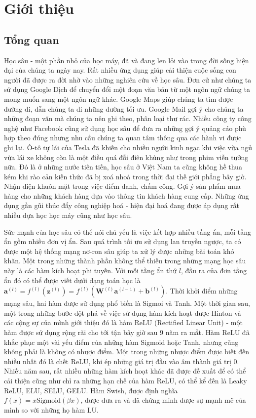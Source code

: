 \chapter{Giới thiệu}\label{chap:gioithieu}

\section{Tổng quan}\label{sec:tongquan}

Học sâu - một phần nhỏ của học máy, đã và đang len lỏi vào trong đời sống hiện đại của chúng ta ngày nay.
Rất nhiều ứng dụng giúp cải thiện cuộc sống con người đã được ra đời nhờ vào những nghiên cứu về học sâu.
Đơn cử như chúng ta sử dụng Google Dịch để chuyển đổi một đoạn văn bản từ một ngôn ngữ chúng ta mong muốn sang một ngôn ngữ khác.
Google Maps giúp chúng ta tìm được đường đi, dẫn chúng ta đi những đường tối ưu.
Google Mail gợi ý cho chúng ta những đoạn văn mà chúng ta nên ghi theo, phân loại thư rác.
Nhiều công ty công nghệ như Facebook cũng sử dụng học sâu để đưa ra những gợi ý quảng cáo phù hợp theo đúng nhưng nhu cầu chúng ta quan tâm thông qua các hành vi được ghi lại.
Ô-tô tự lái của Tesla đã khiến cho nhiều người kinh ngạc khi việc vừa ngủ vừa lái xe không còn là một điều quá đỗi điên khùng như trong phim viễn tưởng nữa.
Đó là ở những nước tiên tiến, học sâu ở Việt Nam ta cũng không hề thua kém khi rào cản kiến thức đã bị xoá nhoà trong thời đại thế giới phẳng bây giờ.
Nhận diện khuôn mặt trong việc điểm danh, chấm công.
Gợi ý sản phẩm mua hàng cho những khách hàng dựa vào thông tin khách hàng cung cấp.
Những ứng dụng gần gũi thúc đẩy công nghiệp hoá - hiện đại hoá đang được áp dụng rất nhiều dựa học học máy cũng như học sâu.
\vspace{5pt}

Sức mạnh của học sâu có thể nói chủ yếu là việc kết hợp nhiều tầng ẩn, mỗi tầng ẩn gồm nhiều đơn vị ẩn.
Sau quá trình tối ưu sử dụng lan truyền ngược, ta có được một hệ thống mạng nơ-ron sâu giúp ta xử lý được những bài toán khó khăn.
Một trong những thành phần không thể thiếu trong những mạng học sâu này là các hàm kích hoạt phi tuyến.
Với mỗi tầng ẩn thứ $l$, đầu ra của đơn tầng ẩn đó có thể được viết dưới dạng toán học là $\displaystyle \mathbf{a}^{(l)} = f^{(l)}\left(\mathbf{z}^{(l)}\right) = f^{(l)}\left(\mathbf{W}^{(l)}\mathbf{a}^{(l-1)} + \mathbf{b}^{(l)}\right)$.
Thời khởi điểm những mạng sâu, hai hàm được sử dụng phổ biến là Sigmoi và Tanh.
Một thời gian sau, một trong những bước đột phá về việc sử dụng hàm kích hoạt được Hinton và các cộng sự của mình giới thiệu đó là hàm ReLU (Rectified Linear Unit) - một hàm được sử dụng rộng rãi cho tới tận bây giờ sau 9 năm ra mắt.
Hàm ReLU đã khắc phục một vài yếu điểm của những hàm Sigmoid hoặc Tanh, nhưng cũng không phải là không có nhược điểm.
Một trong những nhược điểm được biết đến nhiều nhất đó là chết ReLU, khi ép những giá trị đầu vào âm thành giá trị 0.
Nhiều năm sau, rất nhiều những hàm kích hoạt khác đã được đề xuất để có thể cải thiện cũng như chỉ ra những hạn chế của hàm ReLU, có thể kể đến là Leaky ReLU, ELU, SELU, GELU.
Hàm Swish, được định nghĩa $f(x) = x\text{Sigmoid}\left(\beta x\right)$, được đưa ra và đã chứng minh được sự mạnh mẽ của mình so với những họ hàm LU.
\vspace{5pt}

